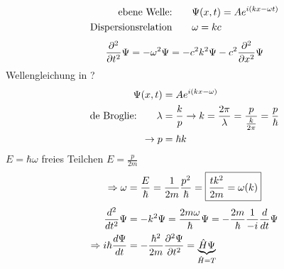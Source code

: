\begin{bem}
    \begin{align*}
    \text{ebene Welle:} &\qquad\Psi(x,t)=Ae^{i \left( kx - \omega t \right) } \\
    \text{Dispersionsrelation} &\qquad\omega = kc 
    \end{align*}
    \begin{equation*}
        \frac{\partial^2}{\partial t^2} \Psi= - \omega^2 \Psi
        = - c^2 k^2 \Psi - c^2 \frac{\partial^2}{\partial x^2} \Psi
    \end{equation*}
    Wellengleichung in \QM?
    \begin{align*}
        \Psi(x,t)&= A e^{i \left( kx - \omega \right)} \\
        \text{de Broglie:} \qquad \lambda &= \frac{k}{p}
        \rightarrow k = \frac{2\pi}{\lambda}=\frac{p}{\frac{k}{2\pi}} = \frac{p}{\hbar} \\
        \rightarrow p &= \hbar k
    \end{align*}
    $E= \hbar \omega$ freies Teilchen $E= \frac{p}{2m}$
    \begin{equation*}
        \Rightarrow \omega 
        = \frac{E}{\hbar}
        = \frac{1}{2m} \frac{p^2}{\hbar} =
        \boxed{
            \frac{tk^2}{2m} = \omega(k)     
        }
    \end{equation*}
    \begin{align*}
        \frac{d^2}{d t^2 } \Psi 
        &=
        - k^2 \Psi = \frac{2m\omega}{\hbar}\Psi
        =-\frac{2m}{\hbar} \frac{1}{-i} \frac{d }{dt} \Psi \\
        \Rightarrow i \hbar \frac{d \Psi}{dt} 
        &= - \frac{\hbar^2}{2m} \frac{\partial^2 \Psi}{\partial t^2}
        =\underbrace{\hat{H}\Psi}_{\hat{H}=T}
    \end{align*}
\end{bem}

